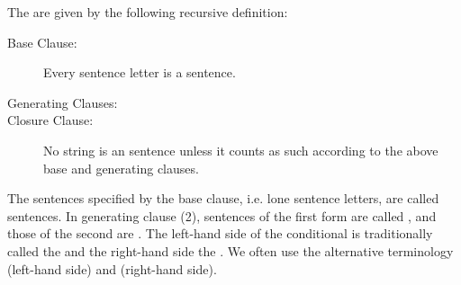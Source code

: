 \begin{majorILnc}{} The   are given by the following recursive definition:
\begin{description}
\item[Base Clause:] Every sentence letter is a sentence.
\item[Generating Clauses:] \hfill
{}
\item[Closure Clause:] No string is an \GSL{} sentence unless it counts as such according to the above base and generating clauses.
\end{description}
\end{majorILnc}

The sentences specified by the base clause, i.e. lone sentence letters, are called  sentences.
In generating clause (2), sentences of the first form are called , and those of the second are . 
The left-hand side of the conditional is traditionally called the  and the right-hand side the . 
We often use the alternative terminology  (left-hand side) and  (right-hand side).

